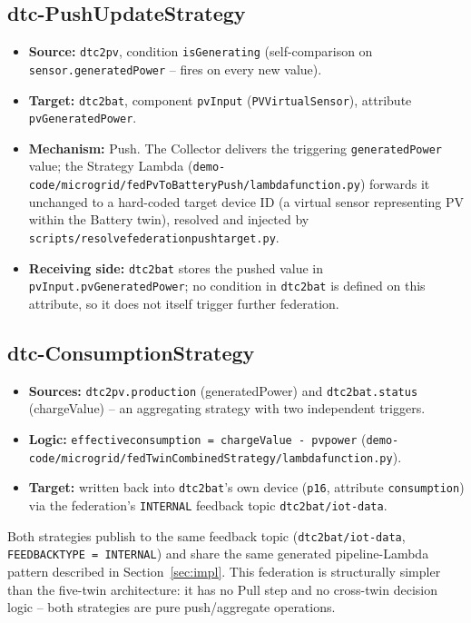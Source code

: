 \documentclass[11pt]{article}
\renewcommand{\_}{\textunderscore\allowbreak}
\begin{document}
\subsection{dtc-PushUpdateStrategy}
\begin{itemize}[nosep]
  \item \textbf{Source:} \texttt{dtc2pv}, condition \texttt{isGenerating}
        (self-comparison on \texttt{sensor.generatedPower} -- fires on every
        new value).
  \item \textbf{Target:} \texttt{dtc2bat}, component \texttt{pvInput}
        (\texttt{PV\_Virtual\_Sensor}), attribute \texttt{pvGeneratedPower}.
  \item \textbf{Mechanism:} Push. The Collector delivers the triggering
        \texttt{generatedPower} value; the Strategy Lambda
        (\texttt{demo-code/microgrid/fedPvToBatteryPush/lambda\_function.py})
        forwards it unchanged to a hard-coded target device ID (a virtual
        sensor representing PV within the Battery twin), resolved and
        injected by \texttt{scripts/resolve\_federation\_push\_target.py}.
  \item \textbf{Receiving side:} \texttt{dtc2bat} stores the pushed value in
        \texttt{pvInput.pvGeneratedPower}; no condition in \texttt{dtc2bat}
        is defined on this attribute, so it does not itself trigger further
        federation.
\end{itemize}

\subsection{dtc-ConsumptionStrategy}
\begin{itemize}[nosep]
  \item \textbf{Sources:} \texttt{dtc2pv.production} (generatedPower) and
        \texttt{dtc2bat.status} (chargeValue) -- an aggregating strategy
        with two independent triggers.
  \item \textbf{Logic:} \texttt{effective\_consumption = chargeValue - pv\_power}
        (\texttt{demo-code/microgrid/fedTwinCombinedStrategy/lambda\_function.py}).
  \item \textbf{Target:} written back into \texttt{dtc2bat}'s own device
        (\texttt{p16}, attribute \texttt{consumption}) via the federation's
        \texttt{INTERNAL} feedback topic \texttt{dtc2bat/iot-data}.
\end{itemize}

Both strategies publish to the same feedback topic
(\texttt{dtc2bat/iot-data}, \texttt{FEEDBACK\_TYPE = INTERNAL}) and share the
same generated pipeline-Lambda pattern described in Section~\ref{sec:impl}.
This federation is structurally simpler than the five-twin architecture: it
has no Pull step and no cross-twin decision logic -- both strategies are pure
push/aggregate operations.
\end{document}
